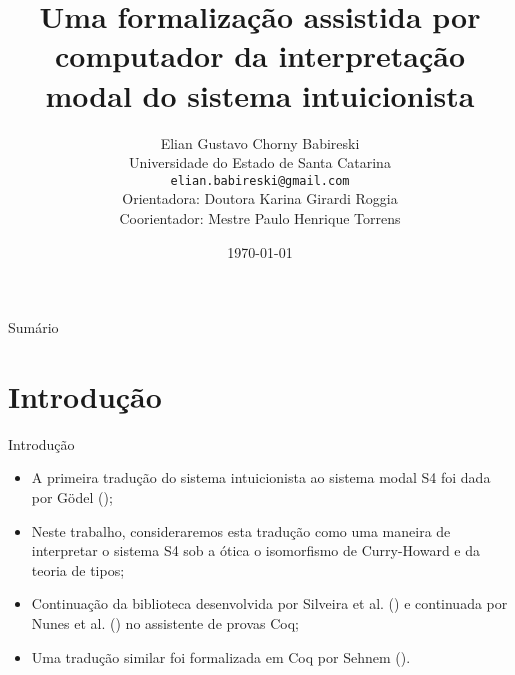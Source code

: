 \documentclass[table]{beamer}
\title[]{Uma formalização assistida por computador da interpretação modal do sistema intuicionista}
\author[Babireski]{
    Elian Gustavo Chorny Babireski\\\smallskip
    {\scriptsize Universidade do Estado de Santa Catarina \\\smallskip
    \vspace{-2mm}
    \texttt{elian.babireski@gmail.com}\\\medskip
    {Orientadora: Doutora Karina Girardi Roggia}\\
    {Coorientador: Mestre Paulo Henrique Torrens}
    }
}
\date{\today}
\begin{document}
\setlength{\abovedisplayskip}{-5pt}
\setlength{\belowdisplayskip}{0pt}
\setlength{\abovedisplayshortskip}{0pt}
\setlength{\belowdisplayshortskip}{0pt}

    \begin{frame}
        \titlepage
    \end{frame}

    \begin{frame}[allowframebreaks]{Sumário}
        \tableofcontents
    \end{frame}

    \section[]{Introdução}
    \begin{frame}{Introdução}
        \begin{itemize}
            \justifying{}
            \item A primeira tradução do sistema intuicionista ao sistema modal S4 foi dada por Gödel (\citeyear{Goedel});
            \item Neste trabalho, consideraremos esta tradução como uma maneira de interpretar o sistema S4 sob a ótica o isomorfismo de Curry-Howard e da teoria de tipos;
            \item Continuação da biblioteca desenvolvida por Silveira et al. (\citeyear{Silveira}) e continuada por Nunes et al. (\citeyear{Nunes}) no assistente de provas Coq;
            \item Uma tradução similar foi formalizada em Coq por Sehnem (\citeyear{Sehnem}).
        \end{itemize}
    \end{frame}
\end{document}
